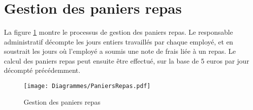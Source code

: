 \section{Gestion des paniers repas}
\paragraph{} La figure \ref{repas} montre le processus de gestion des paniers repas. Le responsable administratif décompte les jours entiers travaillés par chaque employé, et en soustrait les jours où l'employé a soumis une note de frais liée à un repas. Le calcul des paniers repas peut ensuite être effectué, sur la base de 5 euros par jour décompté précédemment.



\begin{figure}[H]
\centering
	\texttt{[image: Diagrammes/PaniersRepas.pdf]}
	\caption{Gestion des paniers repas}
	\label{repas}
\end{figure}






